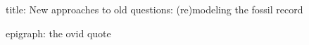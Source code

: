 \documentclass[12pt,letterpaper]{article}
\begin{document}
title: New approaches to old questions: (re)modeling the fossil record

epigraph: the ovid quote
\end{document}
